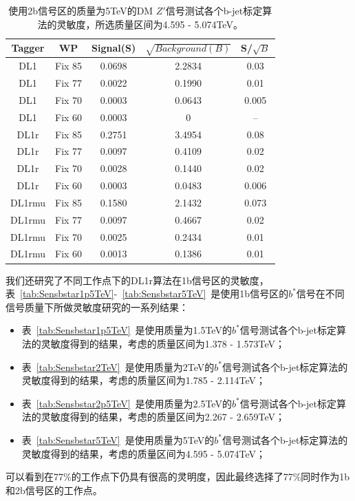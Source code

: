 \begin{table}[ht]
	\begin{center}
		\begin{tabular}{|c|c|c|c|c|}\hline
			Tagger       & WP          & Signal(S)    & $\sqrt{Background(B)}$    & S/$\sqrt{B}$ \\
			\hline
			DL1          & Fix 85      & 0.0698      & 2.2834         & 0.03        \\
			DL1          & Fix 77      & 0.0022      & 0.1990         & 0.01        \\
			DL1          & Fix 70      & 0.0003      & 0.0643         & 0.005        \\
			DL1          & Fix 60      & 0.0003      & 0              & --           \\
			\hline
			DL1r          & Fix 85      & 0.2751       & 3.4954        & 0.08        \\
			DL1r          & Fix 77      & 0.0097       & 0.4109        & 0.02        \\
			DL1r          & Fix 70      & 0.0028       & 0.1440        & 0.02        \\
			DL1r          & Fix 60      & 0.0003       & 0.0483        & 0.006        \\
			\hline
			DL1rmu          & Fix 85      & 0.1580     & 2.1432       & 0.073        \\
			DL1rmu          & Fix 77      & 0.0097     & 0.4667       & 0.02        \\
			DL1rmu          & Fix 70      & 0.0025     & 0.2434       & 0.01        \\
			DL1rmu          & Fix 60      & 0.0013     & 0.1386       & 0.01        \\
			\hline
		\end{tabular}
	\end{center}
	\caption{使用2b信号区的质量为5TeV的DM $Z\prime$信号测试各个b-jet标定算法的灵敏度，所选质量区间为4.595 - 5.074TeV。}
	\label{tab:SenZ5TeV}
\end{table}


我们还研究了不同工作点下的DL1r算法在1b信号区的灵敏度，
表~\ref{tab:Sensbstar1p5TeV}-~\ref{tab:Sensbstar5TeV}~是使用1b信号区的$b^*$信号在不同信号质量下所做灵敏度研究的一系列结果：
\begin{itemize}
	 \item 表~\ref{tab:Sensbstar1p5TeV}~是使用质量为1.5TeV的$b^*$信号测试各个b-jet标定算法的灵敏度得到的结果，考虑的质量区间为1.378 - 1.573TeV；
	\item 表~\ref{tab:Sensbstar2TeV}~是使用质量为2TeV的$b^*$信号测试各个b-jet标定算法的灵敏度得到的结果，考虑的质量区间为1.785 - 2.114TeV；
	\item 表~\ref{tab:Sensbstar2p5TeV}~是使用质量为2.5TeV的$b^*$信号测试各个b-jet标定算法的灵敏度得到的结果，考虑的质量区间为2.267 - 2.659TeV；
	\item 表~\ref{tab:Sensbstar5TeV}~是使用质量为5TeV的$b^*$信号测试各个b-jet标定算法的灵敏度得到的结果，考虑的质量区间为4.595 - 5.074TeV；
\end{itemize}
可以看到在77\%的工作点下仍具有很高的灵明度，因此最终选择了77\%同时作为1b和2b信号区的工作点。

